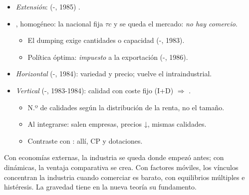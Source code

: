 \documentclass{article}
\begin{document}
\begin{columnas}
\begin{itemize}
  \begin{itemize}
  \item Ej.: $a=10$, $b=1$, $c=2$: $W^{\mathrm{aut}}=24$, $W(\tau)=38-12\tau+\frac{22}{9}\tau^2$: mejora si $\tau<21/11\approx1{,}91$; sin comercio si $\tau\geq3$.
  \item Con libre entrada, domina el procompetitivo.
  \end{itemize}
\item \emph{Extensión}:  (-, 1985) .
\end{itemize}

\begin{itemize}
\item {}, homogéneo: la nacional fija $\tau c$ y se queda el mercado: \emph{no hay comercio}.
  \begin{itemize}
  \item El dumping exige cantidades o capacidad (-, 1983).
  \item Política óptima: \emph{impuesto} a la exportación (-, 1986).
  \end{itemize}
\item \emph{Horizontal} (-, 1984): variedad y precio; vuelve el intraindustrial.
\item \emph{Vertical} (-, 1983-1984): calidad con coste fijo (I+D) $\Rightarrow$ .
  \begin{itemize}
  \item N.º de calidades según la distribución de la renta, no el tamaño.
  \item Al integrarse: salen empresas, precios ↓, mismas calidades.
  \item Contraste con : allí, CP y dotaciones.
  \end{itemize}
\end{itemize}

\begin{ideaclave}
Con economías externas, la industria se queda donde empezó antes; con dinámicas, la ventaja comparativa se crea. Con factores móviles, los vínculos concentran la industria cuando comerciar es barato, con equilibrios múltiples e histéresis. La gravedad tiene en la nueva teoría su fundamento.
\end{ideaclave}


\end{columnas}
\end{document}
